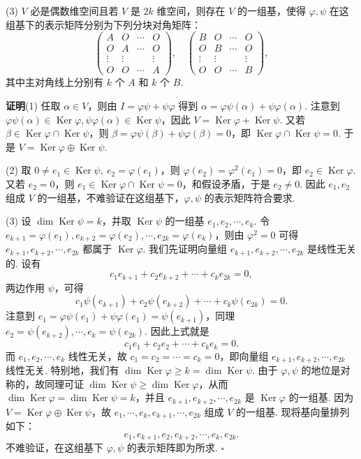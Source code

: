 \documentclass[UTF8,12pt,a4paper,fontset=fandol]{ctexart}
\begin{document}
(3) $V$ 必是偶数维空间且若 $V$ 是 $2k$ 维空间，则存在 $V$ 的一组基，使得 $\varphi,\psi$ 在这组基下的表示矩阵分别为下列分块对角矩阵：
\[
\left(\begin{array}{cccc}
A & O & \cdots & O\\
O & A & \cdots & O\\
\vdots & \vdots &        & \vdots\\
O & O & \cdots & A
\end{array}\right),\quad
\left(\begin{array}{cccc}
B & O & \cdots & O\\
O & B & \cdots & O\\
\vdots & \vdots &        & \vdots\\
O & O & \cdots & B
\end{array}\right),
\]
其中主对角线上分别有 $k$ 个 $A$ 和 $k$ 个 $B$.

\noindent\textbf{证明}\quad (1) 任取 $\alpha\in V$，则由 $I=\varphi\psi+\psi\varphi$ 得到 $\alpha=\varphi\psi(\alpha)+\psi\varphi(\alpha)$. 注意到 $\varphi\psi(\alpha)\in\operatorname{Ker}\varphi,\psi\varphi(\alpha)\in\operatorname{Ker}\psi$，因此 $V=\operatorname{Ker}\varphi+\operatorname{Ker}\psi$. 又若 $\beta\in\operatorname{Ker}\varphi\cap\operatorname{Ker}\psi$，则 $\beta=\varphi\psi(\beta)+\psi\varphi(\beta)=0$，即 $\operatorname{Ker}\varphi\cap\operatorname{Ker}\psi=0$. 于是 $V=\operatorname{Ker}\varphi\oplus\operatorname{Ker}\psi$.

(2) 取 $0\ne e_1\in\operatorname{Ker}\psi,\ e_2=\varphi(e_1)$，则 $\varphi(e_2)=\varphi^2(e_1)=0$，即 $e_2\in\operatorname{Ker}\varphi$. 又若 $e_2=0$，则 $e_1\in\operatorname{Ker}\varphi\cap\operatorname{Ker}\psi=0$，和假设矛盾，于是 $e_2\ne0$. 因此 $e_1,e_2$ 组成 $V$ 的一组基，不难验证在这组基下，$\varphi,\psi$ 的表示矩阵符合要求.

(3) 设 $\dim\operatorname{Ker}\psi=k$，并取 $\operatorname{Ker}\psi$ 的一组基 $e_1,e_2,\cdots,e_k$. 令 $e_{k+1}=\varphi(e_1),e_{k+2}=\varphi(e_2),\cdots,e_{2k}=\varphi(e_k)$，则由 $\varphi^2=0$ 可得 $e_{k+1},e_{k+2},\cdots,e_{2k}$ 都属于 $\operatorname{Ker}\varphi$. 我们先证明向量组 $e_{k+1},e_{k+2},\cdots,e_{2k}$ 是线性无关的. 设有
\[
c_1e_{k+1}+c_2e_{k+2}+\cdots+c_ke_{2k}=0,
\]
两边作用 $\psi$，可得
\[
c_1\psi(e_{k+1})+c_2\psi(e_{k+2})+\cdots+c_k\psi(e_{2k})=0.
\]
注意到 $e_1=\varphi\psi(e_1)+\psi\varphi(e_1)=\psi(e_{k+1})$，同理 $e_2=\psi(e_{k+2}),\cdots,e_k=\psi(e_{2k})$. 因此上式就是
\[
c_1e_1+c_2e_2+\cdots+c_ke_k=0.
\]
而 $e_1,e_2,\cdots,e_k$ 线性无关，故 $c_1=c_2=\cdots=c_k=0$，即向量组 $e_{k+1},e_{k+2},\cdots,e_{2k}$ 线性无关. 特别地，我们有 $\dim\operatorname{Ker}\varphi\ge k=\dim\operatorname{Ker}\psi$. 由于 $\varphi,\psi$ 的地位是对称的，故同理可证 $\dim\operatorname{Ker}\psi\ge\dim\operatorname{Ker}\varphi$，从而 $\dim\operatorname{Ker}\varphi=\dim\operatorname{Ker}\psi=k$，并且 $e_{k+1},e_{k+2},\cdots,e_{2k}$ 是 $\operatorname{Ker}\varphi$ 的一组基. 因为 $V=\operatorname{Ker}\varphi\oplus\operatorname{Ker}\psi$，故 $e_1,\cdots,e_k,e_{k+1},\cdots,e_{2k}$ 组成 $V$ 的一组基. 现将基向量排列如下：
\[
e_1,e_{k+1},e_2,e_{k+2},\cdots,e_k,e_{2k}.
\]
不难验证，在这组基下 $\varphi,\psi$ 的表示矩阵即为所求. $\square$
\end{document}
